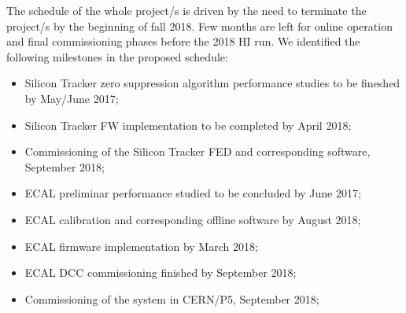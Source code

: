 
The schedule of the whole project/s is driven by the need to terminate the project/s by the beginning of fall 2018. Few months are left for online operation and final commissioning phases before the 2018 HI run. 
We identified the following milestones in the proposed schedule:

\begin{itemize}
\item Silicon Tracker zero suppression algorithm performance studies to be fineshed by May/June 2017;
\item Silicon Tracker FW implementation to be completed by April 2018;
\item Commissioning of the Silicon Tracker FED and corresponding software, September 2018;
\item ECAL preliminar performance studied to be concluded by June 2017;
\item ECAL calibration and corresponding offline software by August 2018;
\item ECAL firmware implementation by March 2018;
\item ECAL DCC commissioning finished by September 2018;
\item Commissioning of the system in CERN/P5, September 2018;
\end{itemize}
